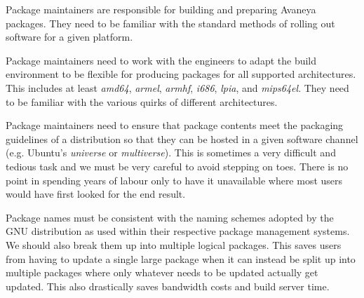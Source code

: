 
Package maintainers are responsible for building and preparing Avaneya packages. They need to be familiar with the standard methods of rolling out software for a given platform. %

Package maintainers need to work with the engineers to adapt the build environment to be flexible for producing packages for all supported architectures. This includes at least {\it amd64}, {\it armel}, {\it armhf}, {\it i686}, {\it lpia}, and {\it mips64el}. They need to be familiar with the various quirks of different architectures.

Package maintainers need to ensure that package contents meet the packaging guidelines of a distribution so that they can be hosted in a given software channel (e.g. Ubuntu's {\it universe} or {\it multiverse}). This is sometimes a very difficult and tedious task and we must be very careful to avoid stepping on toes. There is no point in spending years of labour only to have it unavailable where most users would have first looked for the end result.

Package names must be consistent with the naming schemes adopted by the GNU distribution as used within their respective package management systems. We should also break them up into multiple logical packages. This saves users from having to update a single large package when it can instead be split up into multiple packages where only whatever needs to be updated actually get updated. This also drastically saves bandwidth costs and build server time.



\StopChapter

